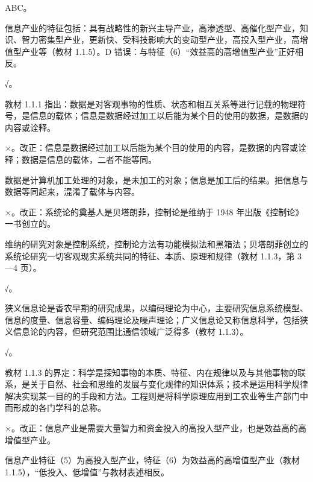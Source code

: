 \documentclass[a4paper,11pt]{article}
\begin{document}
\q ABC。\begin{analysis}信息产业的特征包括：具有战略性的新兴主导产业，高渗透型、高催化型产业，知识、智力密集型产业，更新快、受科技影响大的变动型产业，高投入型产业，高增值型产业等（教材 1.1.5）。D 错误：与特征（6）“效益高的高增值型产业”正好相反。\end{analysis}


\q √。\begin{analysis}教材 1.1.1 指出：数据是对客观事物的性质、状态和相互关系等进行记载的物理符号，是信息的载体；信息是数据经过加工以后能为某个目的使用的数据，是数据的内容或诠释。\end{analysis}

\q ×。改正：信息是数据经过加工以后能为某个目的使用的内容，是数据的内容或诠释；数据是信息的载体，二者不能等同。\begin{analysis}数据是计算机加工处理的对象，是未加工的对象；信息是加工后的结果。把信息与数据等同起来，混淆了载体与内容。\end{analysis}

\q ×。改正：系统论的奠基人是贝塔朗菲，控制论是维纳于 1948 年出版《控制论》一书创立的。\begin{analysis}维纳的研究对象是控制系统，控制论方法有功能模拟法和黑箱法；贝塔朗菲创立的系统论研究一切客观现实系统共同的特征、本质、原理和规律（教材 1.1.3，第 3—4 页）。\end{analysis}

\q √。\begin{analysis}狭义信息论是香农早期的研究成果，以编码理论为中心，主要研究信息系统模型、信息的度量、信息容量、编码理论及噪声理论；广义信息论又称信息科学，包括狭义信息论的内容，但研究范围比通信领域广泛得多（教材 1.1.3）。\end{analysis}

\q √。\begin{analysis}教材 1.1.3 的界定：科学是探知事物的本质、特征、内在规律以及与其他事物的联系，是关于自然、社会和思维的发展与变化规律的知识体系；技术是运用科学规律解决实现某一目的的手段和方法。工程则是将科学原理应用到工农业等生产部门中而形成的各门学科的总称。\end{analysis}

\q ×。改正：信息产业是需要大量智力和资金投入的高投入型产业，也是效益高的高增值型产业。\begin{analysis}信息产业特征（5）为高投入型产业，特征（6）为效益高的高增值型产业（教材 1.1.5），“低投入、低增值”与教材表述相反。\end{analysis}
\end{document}
